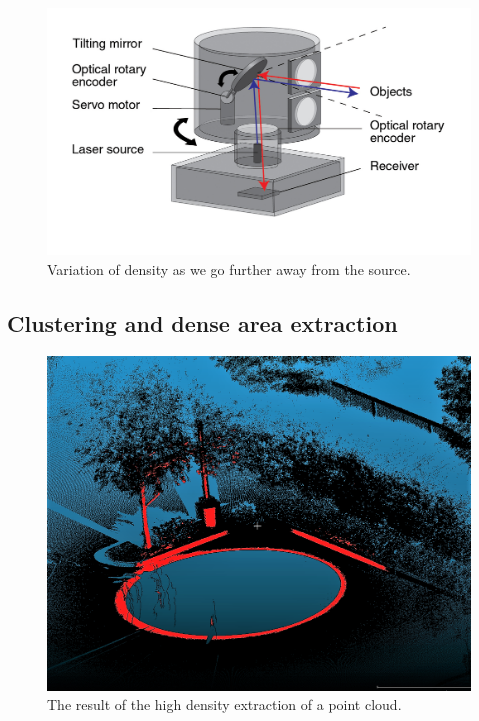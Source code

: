\begin{figure}
  \centering
  \includegraphics[scale=1]{img/lidar.jpg}
  \caption{Variation of density as we go further away from the source.}
  \label{fig:density}
\end{figure}


\subsection{Clustering and dense area extraction}
\label{subsc:highdens}
\begin{figure}
  \centering
  \includegraphics[scale=0.44]{img/highdens.png}
  \caption{The result of the high density extraction of a point cloud.}
  \label{fig:highdens}
\end{figure}

